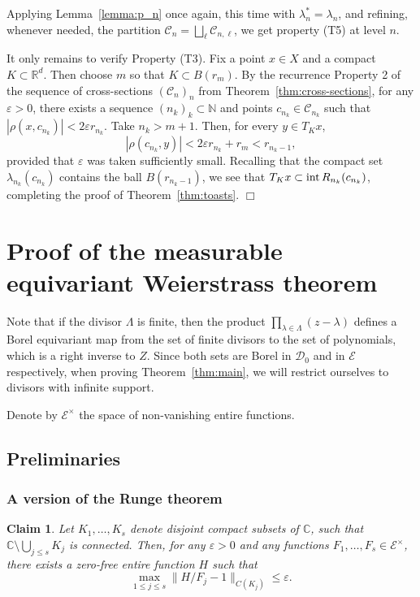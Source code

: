 \documentclass[11pt]{paper}
\newtheorem{claim}{Claim}
\newcommand{\bR}{\mathbb R}
\newcommand{\bC}{\mathbb C}
\newcommand{\bN}{\mathbb N}
\newcommand{\cE}{\mathcal E}
\newcommand{\cD}{\mathcal D}
\newcommand{\cC}{\mathcal C}
\newcommand{\eps}{\varepsilon}
\newcommand{\la}{\lambda}
\begin{document}
Applying Lemma~\ref{lemma:p_n} once again, this time with $\la_n^* = \la_n$, and refining,
whenever needed, the partition $\cC_n = \bigsqcup_\ell \cC_{n, \ell}$, we get property
(T5) at level $n$.

\medskip It only remains to verify Property (T3).
Fix a point $x\in X$ and a compact $K\subset \bR^d$. Then choose $m$ so that $K\subset B(r_m)$.
By the recurrence Property 2 of the sequence of cross-sections $(\cC_n)_n$ from Theorem~\ref{thm:cross-sections}, for any $\eps>0$, there
exists a sequence $(n_k)_{k}\subset\bN$ and points $c_{n_k}\in\cC_{n_k}$ such that
$|\rho (x, c_{n_k})|<2\eps r_{n_k}$. Take $n_k>m+1$. Then,
for every $y\in T_K x$,
\[
|\rho (c_{n_k}, y)| < 2\eps r_{n_k} + r_m < r_{n_k-1},
\]
provided that $\eps$ was taken sufficiently small. Recalling that the compact set $\la_{n_k}(c_{n_k})$ contains the ball $B(r_{n_k-1})$, we see that $T_K x \subset {\rm int\,} R_{n_k}(c_{n_k})$,
completing the proof of Theorem~\ref{thm:toasts}. \hfill $\Box$


\section{Proof of the measurable equivariant Weierstrass theorem}
Note that if the divisor $\Lambda$ is finite, then the product $\prod_{\la\in\Lambda}(z-\la)$
defines a Borel equivariant map from the set of finite divisors to the set of polynomials,
which is a right inverse to $Z$. Since both sets are Borel in $\cD_0$ and in $\cE$ respectively,
when proving Theorem~\ref{thm:main}, we will restrict ourselves to divisors with infinite support.

\medskip
Denote by $\cE^\times$ the space of non-vanishing entire functions.

\subsection{Preliminaries}

\subsubsection{A version of the Runge theorem}



\begin{claim}
\label{claim:Runge}
Let $K_{1},\ldots,K_{s}$ denote disjoint compact subsets of $\bC$, such that
$\bC\setminus \bigcup_{j\le s}K_j$ is connected.
Then, for any $\eps>0$ and any functions $F_1,\ldots,F_s\in\cE^\times$,
there exists a zero-free entire function $H$ such that
\[
\max_{1\le j \le s}\lVert H/F_j-1\rVert_{C(K_j)}\le \eps.
\]
\end{claim}
\end{document}
